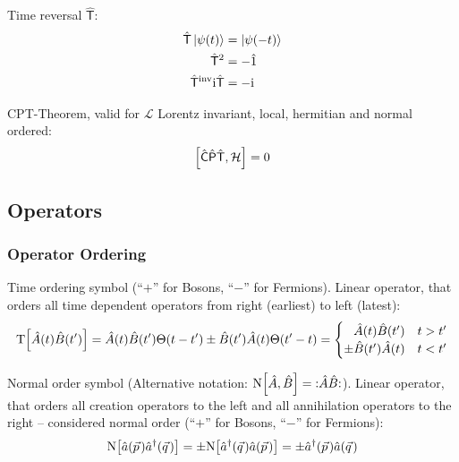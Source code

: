 			\noindent
			Time reversal $\hat{\mathsf{T}}$:
			\begin{equation}
				\begin{aligned}
					\hat{\mathsf{T}} \Ket{\psi(t)} &= \Ket{\psi(-t)} \\
					\hat{\mathsf{T}}^2 &= - \hat{1} \\ 
					{\hat{\mathsf{T}}}^\mathrm{inv} \mathrm{i} \hat{\mathsf{T}} &= -\mathrm{i} \\
				\end{aligned}
			\end{equation}

			\noindent
			CPT-Theorem, valid for $\mathcal{L}$ Lorentz invariant, local, hermitian and normal ordered:
			\begin{equation}
				\comm{\hat{\mathsf{C}}\hat{\mathsf{P}}\hat{\mathsf{T}}}{\mathcal{H}} = 0
			\end{equation}



	\subsection{Operators}
		\subsubsection{Operator Ordering}
			Time ordering symbol (``$+$'' for Bosons, ``$-$'' for Fermions). Linear operator, that orders all time dependent operators from right (earliest) to left (latest):
			\begin{equation}
				\mathrm{T}\qty[\hat{A}(t)\hat{B}(t')]
					= \hat{A}(t) \hat{B}(t') \Theta(t-t') \pm \hat{B}(t') \hat{A}(t) \Theta(t'-t)
					= \begin{cases}
						\phantom{\pm} \hat{A}(t) \hat{B}(t') & t>t' \\
						\pm \hat{B}(t') \hat{A}(t) & t<t'
					\end{cases}
			\end{equation}

			\noindent
			Normal order symbol (Alternative notation: $\mathrm{N}\qty[\hat{A},\hat{B}] = \;:\mathrel{\hat{A} \hat{B}}:$). Linear operator, that orders all creation operators to the left and all annihilation operators to the right -- considered normal order (``$+$'' for Bosons, ``$-$'' for Fermions):
			\begin{equation}
				\begin{aligned}
					\NormalOrder{\hat{a}(\vec{p})\hat{a}^\dagger(\vec{q})} 
					&= \pm \NormalOrder{\hat{a}^\dagger(\vec{q})\hat{a}(\vec{p})} = \pm \hat{a}^\dagger(\vec{p}) \hat{a}(\vec{q}) \\
				\end{aligned}
			\end{equation}

